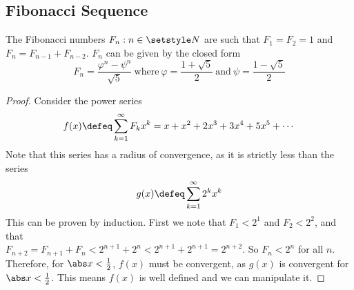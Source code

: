 \subsection{Fibonacci Sequence}

\begin{theorem}
The Fibonacci numbers \(F_n: n \in \Naturals\) are such that
\(F_1 = F_2 = 1\) and \(F_n = F_{n - 1} + F_{n - 2}\).  \(F_n\) can be given
by the closed form
\begin{equation*}
F_n = \frac{\varphi^n - \psi^n}{\sqrt 5}
\ \text{where}\ \varphi = \frac{1 + \sqrt 5} 2
\ \text{and}\ \psi = \frac{1 - \sqrt 5} 2
\end{equation*}
\end{theorem}
\begin{proof}
Consider the power series
\begin{equation*}
f(x) \defeq \sum_{k=1}^\infty F_k x^k = x + x^2 + 2x^3 + 3x^4 + 5x^5
    + \dotsb
\end{equation*}
Note that this series has a radius of convergence, as it is strictly less
than the series
\begin{equation*}
g(x) \defeq \sum_{k=1}^\infty 2^k x^k
\end{equation*}
This can be proven by induction. First we note that \(F_1 < 2^1\) and
\(F_2 < 2^2\), and that \\
\(F_{n + 2} = F_{n + 1} + F_n < 2^{n + 1} + 2^n < 2^{n + 1} + 2^{n + 1}
    = 2^{n + 2}\). So \(F_n < 2^n\) for all \(n\). Therefore, for
\(\abs x < \frac 12\), \(f(x)\)  must be convergent, as \(g(x)\) is
convergent for \(\abs x < \frac 12\). This means \(f(x)\) is well defined
and we can manipulate it.


\end{proof}
